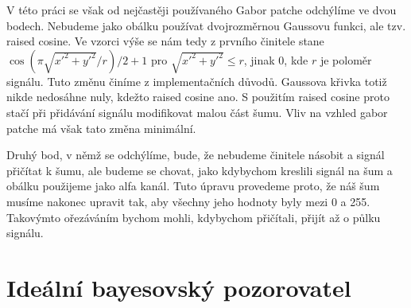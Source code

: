 V této práci se však od nejčastěji používaného Gabor patche
odchýlíme ve dvou bodech. Nebudeme jako obálku používat dvojrozměrnou Gaussovu
funkci, ale tzv. raised cosine. Ve vzorci výše se nám tedy z prvního činitele
stane $\cos(\pi\sqrt{x'^2+y'^2}/r)/2+1$ pro $\sqrt{x'^2+y'^2}\leq r$, jinak 0,
kde $r$ je poloměr signálu. Tuto změnu činíme z implementačních důvodů.
Gaussova křivka totiž nikde nedosáhne nuly, kdežto raised cosine ano. S použitím raised cosine proto stačí při přidávání signálu modifikovat malou část šumu. Vliv na vzhled gabor patche má však tato změna minimální.

Druhý bod, v němž se odchýlíme, bude, že nebudeme činitele násobit a signál
přičítat k šumu, ale budeme se chovat, jako kdybychom kreslili signál na šum a
obálku použijeme jako alfa kanál. Tuto úpravu provedeme proto, že náš šum
musíme nakonec upravit tak, aby všechny jeho hodnoty byly mezi 0 a 255.
Takovýmto ořezáváním bychom mohli, kdybychom přičítali, přijít až o půlku
signálu. 

\section{Ideální bayesovský pozorovatel}
